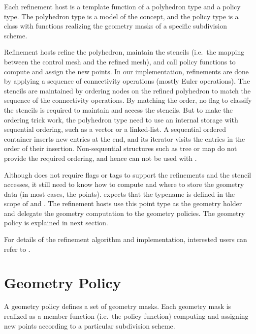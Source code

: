 Each refinement host is a template function of
a polyhedron type and a policy type. The polyhedron type is
a model of the  concept, and the
policy type is a class with functions realizing the 
geometry masks of a specific subdivision scheme.

Refinement hosts refine the polyhedron, maintain the stencils 
(i.e.~the mapping between the control mesh and the refined mesh), 
and call policy functions to compute and assign the new points. 
In our implementation, refinements are done by applying a 
sequence of connectivity operations (mostly Euler operations).
The stencils are maintained by ordering nodes on the refined 
polyhedron to match the sequence of the connectivity operations. 
By matching the order, no flag to classify the stencils 
is required to maintain and access the stencils.
But to make the ordering trick work, the polyhedron type need 
to use an internal storage with sequential ordering, such as
a vector or a linked-list. A sequential ordered container inserts
new entries at the end, and its iterator visits the entries in the 
order of their insertion. Non-sequential structures such as 
tree or map do not provide the required ordering, and hence
can not be used with .
 
Although  does not require flags or 
tags to support the refinements and the stencil accesses, it
still need to know how to compute and where to store the geometry
data (in most cases, the points).  
expects that the typename  is 
defined in the scope of  and . 
The refinement hosts use
this point type as the geometry holder and delegate the geometry
computation to the geometry policies. The geometry policy is 
explained in next section. 

For details of the refinement algorithm and implementation, 
interested users can refer to \cite{cgal:sp-mrbee-05}.

\section{Geometry Policy}
A geometry policy defines a set of geometry masks. 
Each geometry mask is realized as a member function (i.e.~the 
policy function) computing and assigning new points according 
to a particular subdivision scheme. 


